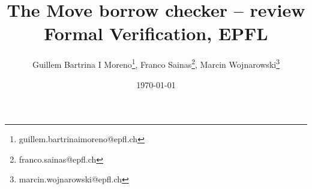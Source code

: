 \documentclass[notitlepage]{article}
\title{The Move borrow checker -- review\\\large Formal Verification, EPFL}
\author{
	Guillem Bartrina I Moreno\thanks{guillem.bartrinaimoreno@epfl.ch},
	Franco Sainas\thanks{franco.sainas@epfl.ch},
	Marcin Wojnarowski\thanks{marcin.wojnarowski@epfl.ch}
}
\date{\today}
\begin{document}
\maketitle

\cite{blackshear2022borrow}

\printbibliography
\end{document}
